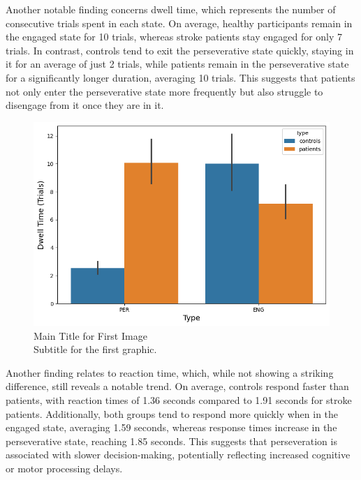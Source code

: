 Another notable finding concerns dwell time, which represents the number of consecutive trials spent in each state. On average, healthy participants remain in the engaged state for 10 trials, whereas stroke patients stay engaged for only 7 trials. In contrast, controls tend to exit the perseverative state quickly, staying in it for an average of just 2 trials, while patients remain in the perseverative state for a significantly longer duration, averaging 10 trials. This suggests that patients not only enter the perseverative state more frequently but also struggle to disengage from it once they are in it.
\begin{figure}[H]
    \centering
    \includegraphics[width=12cm]{MainLayout/Images/chapter7/dwell_time_state.png}
    \caption{Main Title for First Image \\ \small Subtitle for the first graphic.}
    \label{fig:dwell_time_state}
\end{figure}
Another finding relates to reaction time, which, while not showing a striking difference, still reveals a notable trend. On average, controls respond faster than patients, with reaction times of 1.36 seconds compared to 1.91 seconds for stroke patients. Additionally, both groups tend to respond more quickly when in the engaged state, averaging 1.59 seconds, whereas response times increase in the perseverative state, reaching 1.85 seconds. This suggests that perseveration is associated with slower decision-making, potentially reflecting increased cognitive or motor processing delays.  
